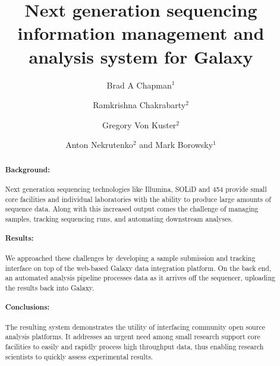 \documentclass[10pt]{bmc_article}
\newenvironment{bmcformat}{\begin{raggedright}\baselineskip20pt\sloppy\setboolean{publ}{false}}{\end{raggedright}\baselineskip20pt\sloppy}
\begin{document}
\begin{bmcformat}


\title{Next generation sequencing information management and analysis
  system for Galaxy}

\author{Brad A Chapman\correspondingauthor$^{1}$%
      \and
        Ramkrishna Chakrabarty$^2$%
      \and
        Gregory Von Kuster$^2$%
      \and
        Anton Nekrutenko$^2$%
      and
         Mark Borowsky$^1$%
      }

\address{%
    \iid(1)Department of Molecular Biology, Simches Research Center,%
    Massachusetts General Hospital, Boston, MA 02114, USA
    \iid(2)Huck Institute for the Life Sciences,%
    Penn State University, University Park, PA 16803, USA
}%

\maketitle

\begin{abstract}
  \paragraph*{Background:} Next generation sequencing technologies
  like Illumina, SOLiD and 454 provide small core facilities and
  individual laboratories with the ability to produce large amounts of sequence
  data. Along with this increased output comes the challenge of
  managing samples, tracking sequencing runs, and automating downstream
  analyses.
  \paragraph*{Results:} We approached these challenges by developing a
  sample submission and tracking interface on top of the web-based
  Galaxy data integration platform. On the back end, an automated
  analysis pipeline processes data as it arrives off the sequencer,
  uploading the results back into Galaxy.
  \paragraph*{Conclusions:} The resulting system demonstrates the
  utility of interfacing community open source analysis platforms.
  It addresses an urgent need among small research support core
  facilities to easily and rapidly process high throughput data, thus
  enabling research scientists to quickly assess experimental
  results.
\end{abstract}


\end{bmcformat}
\end{document}
